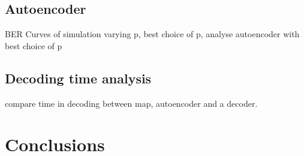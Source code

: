 \documentclass[conference]{IEEEtran}
\begin{document}
\subsection{Autoencoder}
BER Curves of simulation varying p, best choice of p, analyse autoencoder with best choice of p

\subsection{Decoding time analysis}
compare time in decoding between map, autoencoder and a decoder.

\section{Conclusions}

\end{document}
